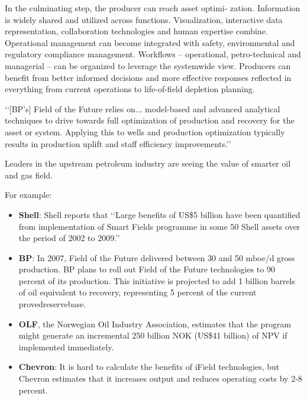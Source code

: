 \documentclass[twocolumn]{article}
\newcommand{\bi}{\begin{itemize}}
\newcommand{\ei}{\end{itemize}}
\newcommand{\ii}{\item}
\begin{document}
In the culminating step, the producer can reach asset optimi- zation. Information is widely shared and utilized across functions. Visualization, interactive data representation, collaboration technologies and human expertise combine. Operational management can become integrated with safety, environmental and regulatory compliance management. Workflows – operational, petro-technical and managerial – can be organized to leverage the systemwide view. Producers can benefit from better informed decisions and more effective responses reflected in everything from current operations to life-of-field depletion planning.


\lq\lq{}[BP’s] Field of the Future relies on... model-based and advanced analytical techniques to drive towards full optimization of production
and recovery for the asset or system. Applying this to wells and production optimization typically results in production uplift and staff efficiency improvements.\rq\rq{}



Leaders in the upstream petroleum industry are seeing the value of smarter oil and gas field.

For example:
\bi
\ii \textbf{Shell}: Shell reports that  \lq\lq{}Large benefits of US\$5 billion have been quantified from implementation of Smart Fields programme in some 50 Shell assets over the period of 2002 to 2009.\rq\rq{}
\ii \textbf{BP}: In 2007, Field of the Future delivered between 30 and 50 mboe/d gross production. BP plans to roll out Field
of the Future technologies to 90 percent of its production. This initiative is projected to add 1 billion barrels of oil equivalent to recovery, representing 5 percent of the current provedreservebase.
\ii \textbf{OLF}, the Norwegian Oil Industry Association, estimates that the program might generate an incremental 250 billion NOK (US\$41 billion) of NPV if implemented immediately.
\ii \textbf{Chevron}: It is hard to calculate the benefits of iField technologies, but Chevron estimates that it increases output and reduces operating costs by 2-8 percent.
\ei
\end{document}
